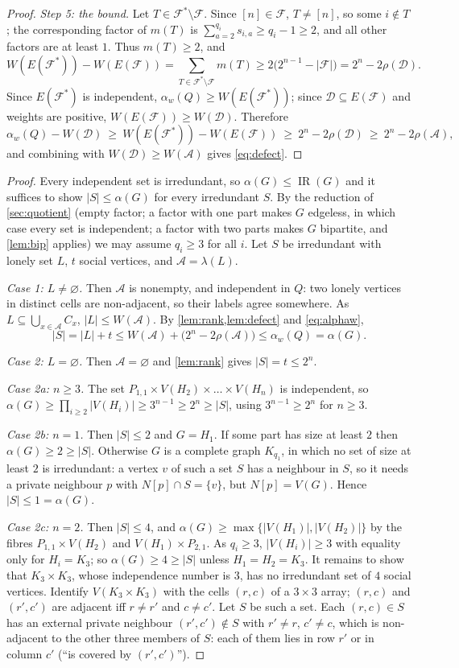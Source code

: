 \documentclass[11pt,a4paper]{article}
\theoremstyle{plain}
\theoremstyle{definition}
\theoremstyle{remark}
\newcommand{\IR}{\operatorname{IR}}
\newcommand{\cA}{\mathcal A}
\newcommand{\cD}{\mathcal D}
\newcommand{\cF}{\mathcal F}
\newcommand{\rk}{\rho}
\newcommand{\alw}{\alpha_w}
\newcommand{\lab}{\lambda}
\begin{document}
\begin{proof}
\emph{Step 5: the bound.} Let $T\in\cF^*\setminus\cF$. Since $[n]\in\cF$, $T\ne[n]$, so some $i\notin T$; the corresponding factor of $m(T)$ is $\sum_{a=2}^{q_i}s_{i,a}\ge q_i-1\ge2$, and all other factors are at least $1$. Thus $m(T)\ge2$, and
\[
W(E(\cF^*))-W(E(\cF))=\sum_{T\in\cF^*\setminus\cF}m(T)\ge2\bigl(2^{n-1}-|\cF|\bigr)=2^n-2\rk(\cD).
\]
Since $E(\cF^*)$ is independent, $\alw(Q)\ge W(E(\cF^*))$; since $\cD\subseteq E(\cF)$ and weights are positive, $W(E(\cF))\ge W(\cD)$. Therefore
\[
\alw(Q)-W(\cD)\ \ge\ W(E(\cF^*))-W(E(\cF))\ \ge\ 2^n-2\rk(\cD)\ \ge\ 2^n-2\rk(\cA),
\]
and combining with $W(\cD)\ge W(\cA)$ gives \eqref{eq:defect}.
\end{proof}

\label{pf:main}
\thmmain*
\begin{proof}
Every independent set is irredundant, so $\alpha(G)\le\IR(G)$ and it suffices to show $|S|\le\alpha(G)$ for every irredundant $S$. By the reduction of \cref{sec:quotient} (empty factor; a factor with one part makes $G$ edgeless, in which case every set is independent; a factor with two parts makes $G$ bipartite, and \cref{lem:bip} applies) we may assume $q_i\ge3$ for all $i$. Let $S$ be irredundant with lonely set $L$, $t$ social vertices, and $\cA=\lab(L)$.

\emph{Case 1: $L\ne\varnothing$.} Then $\cA$ is nonempty, and independent in $Q$: two lonely vertices in distinct cells are non-adjacent, so their labels agree somewhere. As $L\subseteq\bigcup_{x\in\cA}C_x$, $|L|\le W(\cA)$. By \cref{lem:rank,lem:defect} and \eqref{eq:alphaw},
\[
|S|=|L|+t\le W(\cA)+\bigl(2^n-2\rk(\cA)\bigr)\le\alw(Q)=\alpha(G).
\]

\emph{Case 2: $L=\varnothing$.} Then $\cA=\varnothing$ and \cref{lem:rank} gives $|S|=t\le2^n$.

\emph{Case 2a: $n\ge3$.} The set $P_{1,1}\times V(H_2)\times\dots\times V(H_n)$ is independent, so $\alpha(G)\ge\prod_{i\ge2}|V(H_i)|\ge3^{n-1}\ge2^n\ge|S|$, using $3^{n-1}\ge2^n$ for $n\ge3$.

\emph{Case 2b: $n=1$.} Then $|S|\le2$ and $G=H_1$. If some part has size at least $2$ then $\alpha(G)\ge2\ge|S|$. Otherwise $G$ is a complete graph $K_{q_1}$, in which no set of size at least $2$ is irredundant: a vertex $v$ of such a set $S$ has a neighbour in $S$, so it needs a private neighbour $p$ with $N[p]\cap S=\{v\}$, but $N[p]=V(G)$. Hence $|S|\le1=\alpha(G)$.

\emph{Case 2c: $n=2$.} Then $|S|\le4$, and $\alpha(G)\ge\max\{|V(H_1)|,|V(H_2)|\}$ by the fibres $P_{1,1}\times V(H_2)$ and $V(H_1)\times P_{2,1}$. As $q_i\ge3$, $|V(H_i)|\ge3$ with equality only for $H_i=K_3$; so $\alpha(G)\ge4\ge|S|$ unless $H_1=H_2=K_3$. It remains to show that $K_3\times K_3$, whose independence number is $3$, has no irredundant set of $4$ social vertices. Identify $V(K_3\times K_3)$ with the cells $(r,c)$ of a $3\times3$ array; $(r,c)$ and $(r',c')$ are adjacent iff $r\ne r'$ and $c\ne c'$. Let $S$ be such a set. Each $(r,c)\in S$ has an external private neighbour $(r',c')\notin S$ with $r'\ne r$, $c'\ne c$, which is non-adjacent to the other three members of $S$: each of them lies in row $r'$ or in column $c'$ (``is covered by $(r',c')$'').


\end{proof}
\end{document}
